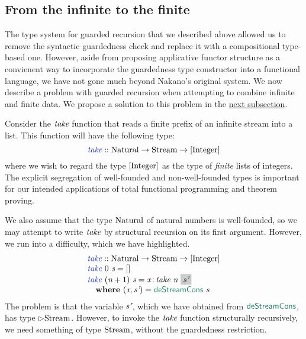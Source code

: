 \subsection{From the infinite to the finite}
\label{sec:infinite-to-finite}

The type system for guarded recursion that we described above allowed
us to remove the syntactic guardedness check and replace it with a
compositional type-based one. However, aside from proposing
applicative functor structure as a convienent way to incorporate the
guardedness type constructor into a functional language, we have not
gone much beyond Nakano's original system. We now describe a problem
with guarded recursion when attempting to combine infinite and finite
data. We propose a solution to this problem in the
\hyperref[sec:clock-vars]{next subsection}.

Consider the $\textit{take}$ function that reads a finite prefix of an
infinite stream into a list. This function will have the following type:
\begin{displaymath}
  \defn{take} :: \tyname{Natural} \to \tyname{Stream} \to [\tyname{Integer}]
\end{displaymath}
where we wish to regard the type $[\textrm{Integer}]$ as the type of
\emph{finite} lists of integers. The explicit segregation of
well-founded and non-well-founded types is important for our intended
applications of total functional programming and theorem proving.

We also assume that the type $\textrm{Natural}$ of natural numbers is
well-founded, so we may attempt to write $\textit{take}$ by structural
recursion on its first argument. However, we run into a difficulty,
which we have \colorbox{greybg}{highlighted}.
\begin{displaymath}
  \begin{array}{l}
    \defn{take} :: \tyname{Natural} \to \tyname{Stream} \to [\tyname{Integer}] \\
    \defn{take}\ 0\ \ident{s} = [] \\
    \defn{take}\ (\ident{n}+1)\ \ident{s} = \ident{x} \mathop{\cons{:}} \ident{take}\ \ident{n}\ \colorbox{greybg}{$\ident{s'}$} \\
    \quad \kw{where}\ (\ident{x}, \ident{s'}) = \elim{deStreamCons}\ \ident{s}
  \end{array}
\end{displaymath}
The problem is that the variable $\textit{s'}$, which we have obtained
from $\elim{deStreamCons}$, has type $\rhd\textrm{Stream}$. However,
to invoke the $\textit{take}$ function structurally recursively, we
need something of type $\textrm{Stream}$, without the guardedness
restriction.

